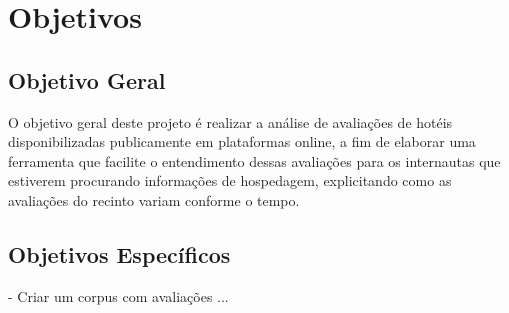 \chapter{Objetivos}

\label{cap:objetivos}

\section{Objetivo Geral}

O objetivo geral deste projeto é realizar a análise de avaliações de hotéis disponibilizadas publicamente em plataformas online, a fim de elaborar uma ferramenta que facilite o entendimento dessas avaliações para os internautas que estiverem procurando informações de hospedagem, explicitando como as avaliações do recinto variam conforme o tempo.

\section{Objetivos Específicos}

- Criar um corpus com avaliações ...


